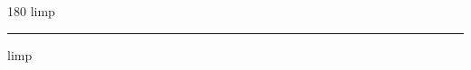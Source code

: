 
\begin{frame}
\begin{center}
\begin{turn}{180}
{\fontsize{2.5cm}{1em}\selectfont limp}
\end{turn}
\vspace{1em}\par  
\hrule
\vspace{1em}\par  
{\fontsize{2.5cm}{1em}\selectfont limp}
\end{center}
\end{frame}
